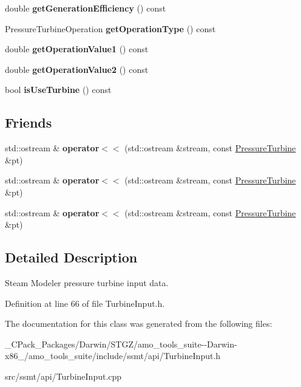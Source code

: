 \begin{DoxyCompactItemize}
double {\bfseries get\+Generation\+Efficiency} () const
\item 
\mbox{\label{class_pressure_turbine_a4618372da7c53adbececfc476c6775b0}} 
Pressure\+Turbine\+Operation {\bfseries get\+Operation\+Type} () const
\item 
\mbox{\label{class_pressure_turbine_a95e1c8725ad8035549baf8877343d3d9}} 
double {\bfseries get\+Operation\+Value1} () const
\item 
\mbox{\label{class_pressure_turbine_aee57986c0c741d5b1df72fb00f480a56}} 
double {\bfseries get\+Operation\+Value2} () const
\item 
\mbox{\label{class_pressure_turbine_ac8064c2c5c1b5acd7846a3a8036ef0bb}} 
bool {\bfseries is\+Use\+Turbine} () const
\end{DoxyCompactItemize}
\subsection*{Friends}
\begin{DoxyCompactItemize}
\item 
\mbox{\label{class_pressure_turbine_a216bfbdf7e4276d43094618b723af8bf}} 
std\+::ostream \& {\bfseries operator$<$$<$} (std\+::ostream \&stream, const \hyperlink{class_pressure_turbine}{Pressure\+Turbine} \&pt)
\item 
\mbox{\label{class_pressure_turbine_a216bfbdf7e4276d43094618b723af8bf}} 
std\+::ostream \& {\bfseries operator$<$$<$} (std\+::ostream \&stream, const \hyperlink{class_pressure_turbine}{Pressure\+Turbine} \&pt)
\item 
\mbox{\label{class_pressure_turbine_a216bfbdf7e4276d43094618b723af8bf}} 
std\+::ostream \& {\bfseries operator$<$$<$} (std\+::ostream \&stream, const \hyperlink{class_pressure_turbine}{Pressure\+Turbine} \&pt)
\end{DoxyCompactItemize}


\subsection{Detailed Description}
Steam Modeler pressure turbine input data. 

Definition at line 66 of file Turbine\+Input.\+h.



The documentation for this class was generated from the following files\+:\begin{DoxyCompactItemize}
\item 
\+\_\+\+C\+Pack\+\_\+\+Packages/\+Darwin/\+S\+T\+G\+Z/amo\+\_\+tools\+\_\+suite-\/-\/\+Darwin-\/x86\+\_/amo\+\_\+tools\+\_\+suite/include/ssmt/api/Turbine\+Input.\+h\item 
src/ssmt/api/Turbine\+Input.\+cpp\end{DoxyCompactItemize}
